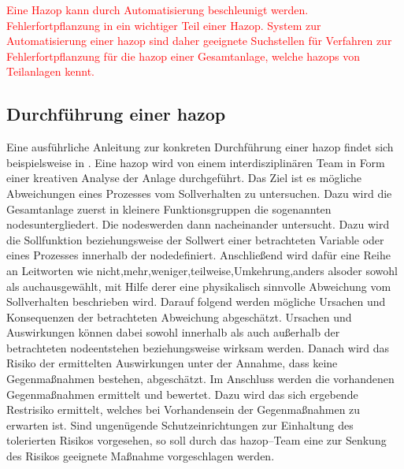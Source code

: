 \textcolor{red}{Eine Hazop kann durch Automatisierung beschleunigt werden. Fehlerfortpflanzung in ein wichtiger Teil einer Hazop. System zur Automatisierung einer hazop sind daher geeignete Suchstellen f\"ur Verfahren zur Fehlerfortpflanzung f\"ur die hazop einer Gesamtanlage, welche hazops von Teilanlagen kennt. }
\subsection{Durchf\"uhrung einer \ac{hazop}}
Eine ausf\"uhrliche Anleitung zur konkreten Durchf\"uhrung einer \ac{hazop} findet sich beispielsweise in  \cite{Crawley_2015}. \newline
Eine \ac{hazop} wird von einem interdisziplin\"aren Team in Form einer kreativen Analyse der Anlage durchgef\"uhrt. Das Ziel ist es m\"ogliche Abweichungen eines Prozesses vom Sollverhalten zu untersuchen. Dazu wird die Gesamtanlage zuerst in kleinere Funktionsgruppen die sogenannten \glqq nodes\grqq { }untergliedert. Die \glqq nodes\grqq { }werden dann nacheinander untersucht. Dazu wird die Sollfunktion beziehungsweise der Sollwert einer betrachteten Variable oder eines Prozesses innerhalb der \glqq node\grqq { }definiert. Anschlie\ss{}end wird daf\"ur eine Reihe an Leitworten wie  nicht\grqq { },\glqq mehr\grqq { },\glqq weniger\grqq { },\glqq teilweise\grqq { },\glqq Umkehrung\grqq { },\glqq anders als\grqq { }oder \glqq sowohl als auch\grqq { }ausgew\"ahlt, mit Hilfe derer eine physikalisch sinnvolle Abweichung vom Sollverhalten beschrieben wird. Darauf folgend werden m\"ogliche Ursachen und Konsequenzen der betrachteten Abweichung abgesch\"atzt. Ursachen und Auswirkungen k\"onnen dabei sowohl innerhalb als auch au\ss{}erhalb der betrachteten \glqq node\grqq { }entstehen beziehungsweise wirksam werden. Danach wird das Risiko der ermittelten Auswirkungen unter der Annahme, dass keine Gegenma\ss{}nahmen bestehen, abgesch\"atzt. Im Anschluss werden die vorhandenen Gegenma\ss{}nahmen ermittelt und bewertet. Dazu wird das sich ergebende Restrisiko ermittelt, welches bei Vorhandensein der Gegenma\ss{}nahmen zu erwarten ist. Sind ungen\"ugende Schutzeinrichtungen zur Einhaltung des tolerierten Risikos vorgesehen, so soll durch das \ac{hazop}--Team eine zur Senkung des Risikos geeignete Ma\ss{}nahme vorgeschlagen werden.

